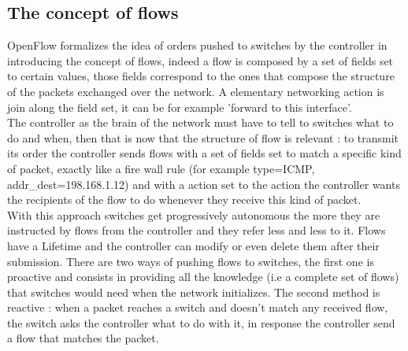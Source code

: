 \documentclass{article}
\begin{document}
\subsection{The concept of flows}
OpenFlow formalizes the idea of orders pushed to switches by the
controller in introducing the concept of flows, indeed a flow is
composed by a set of fields set to certain values, those fields
correspond to the ones that compose the structure of the packets
exchanged over the network. A elementary networking action is join
along the field set, it can be for example 'forward to this
interface'.\\
\newline
The controller as the brain of the network must have to tell to
switches what to do and when, then that is now that the structure of
flow is relevant : to transmit its order the controller sends flows
with a set of fields set to match a specific kind of packet, exactly
like a fire wall rule (for example type=ICMP, addr\_dest=198.168.1.12)
and with a action set to the action the controller wants the
recipients of the flow to do whenever they receive this kind of
packet.\\
\newline
With this approach switches get progressively autonomous the more they
are instructed by flows from the controller and they refer less and
less to it. Flows have a Lifetime and the controller can modify or
even delete them after their submission.  There are two ways of
pushing flows to switches, the first one is proactive and consists in
providing all the knowledge (i.e a complete set of flows) that
switches would need when the network initializes.  The second method
is reactive : when a packet reaches a switch and doesn't match any
received flow, the switch asks the controller what to do with it, in
response the controller send a flow that matches the packet.
\end{document}
